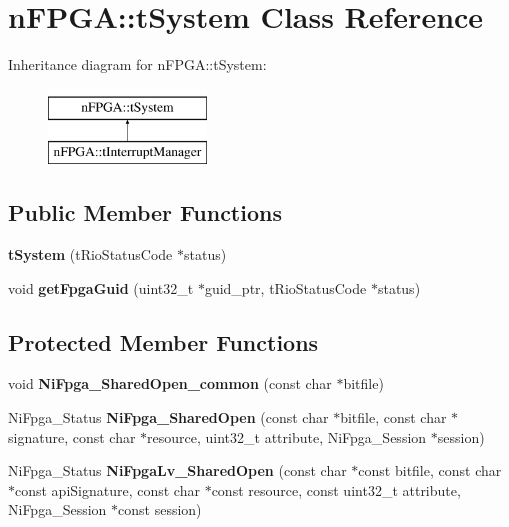 \hypertarget{classnFPGA_1_1tSystem}{
\section{nFPGA::tSystem Class Reference}
\label{classnFPGA_1_1tSystem}
}
Inheritance diagram for nFPGA::tSystem:\begin{figure}[H]
\begin{center}
\leavevmode
\includegraphics[height=2.000000cm]{classnFPGA_1_1tSystem}
\end{center}
\end{figure}
\subsection*{Public Member Functions}
\begin{DoxyCompactItemize}
\item 
\hypertarget{classnFPGA_1_1tSystem_ad2b6e1a75fcaa44dc055f9ed22067bf4}{
{\bfseries tSystem} (tRioStatusCode $\ast$status)}
\label{classnFPGA_1_1tSystem_ad2b6e1a75fcaa44dc055f9ed22067bf4}

\item 
\hypertarget{classnFPGA_1_1tSystem_ade8e9ad87abfc451ef50c17d7bf877fd}{
void {\bfseries getFpgaGuid} (uint32\_\-t $\ast$guid\_\-ptr, tRioStatusCode $\ast$status)}
\label{classnFPGA_1_1tSystem_ade8e9ad87abfc451ef50c17d7bf877fd}

\end{DoxyCompactItemize}
\subsection*{Protected Member Functions}
\begin{DoxyCompactItemize}
\item 
\hypertarget{classnFPGA_1_1tSystem_a95c9415cfbbe4eac98927d015d29e2c6}{
void {\bfseries NiFpga\_\-SharedOpen\_\-common} (const char $\ast$bitfile)}
\label{classnFPGA_1_1tSystem_a95c9415cfbbe4eac98927d015d29e2c6}

\item 
\hypertarget{classnFPGA_1_1tSystem_aec972a21c6d3fdcf193134fc1a1daf24}{
NiFpga\_\-Status {\bfseries NiFpga\_\-SharedOpen} (const char $\ast$bitfile, const char $\ast$signature, const char $\ast$resource, uint32\_\-t attribute, NiFpga\_\-Session $\ast$session)}
\label{classnFPGA_1_1tSystem_aec972a21c6d3fdcf193134fc1a1daf24}

\item 
\hypertarget{classnFPGA_1_1tSystem_a143a0ff469aa3e61a17761e7125e510b}{
NiFpga\_\-Status {\bfseries NiFpgaLv\_\-SharedOpen} (const char $\ast$const bitfile, const char $\ast$const apiSignature, const char $\ast$const resource, const uint32\_\-t attribute, NiFpga\_\-Session $\ast$const session)}
\label{classnFPGA_1_1tSystem_a143a0ff469aa3e61a17761e7125e510b}

\end{DoxyCompactItemize}
